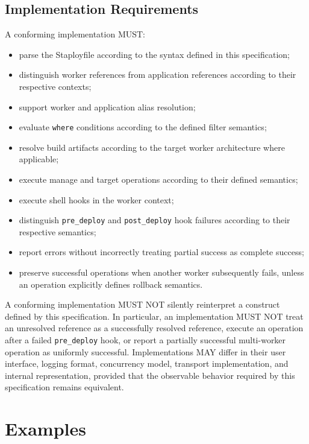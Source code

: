 \documentclass[11pt,a4paper]{article}
\begin{document}
    \subsection{Implementation Requirements}\label{subsec:implementation-requirements}

    A conforming implementation MUST:

    \begin{itemize}
        \item parse the Staployfile according to the syntax defined in this specification;
        \item distinguish worker references from application references according to their respective contexts;
        \item support worker and application alias resolution;
        \item evaluate \texttt{where} conditions according to the defined filter semantics;
        \item resolve build artifacts according to the target worker architecture where applicable;
        \item execute manage and target operations according to their defined semantics;
        \item execute shell hooks in the worker context;
        \item distinguish \texttt{pre\_deploy} and \texttt{post\_deploy} hook failures according to their respective semantics;
        \item report errors without incorrectly treating partial success as complete success;
        \item preserve successful operations when another worker subsequently fails, unless an operation explicitly defines rollback semantics.
    \end{itemize}

    A conforming implementation MUST NOT silently reinterpret a construct defined by this specification.
    In particular, an implementation MUST NOT treat an unresolved reference as a successfully resolved reference, execute an operation after a failed \texttt{pre\_deploy} hook, or report a partially successful multi-worker operation as uniformly successful.
    Implementations MAY differ in their user interface, logging format, concurrency model, transport implementation, and internal representation, provided that the observable behavior required by this specification remains equivalent.


    \section{Examples}\label{sec:examples}
\end{document}
